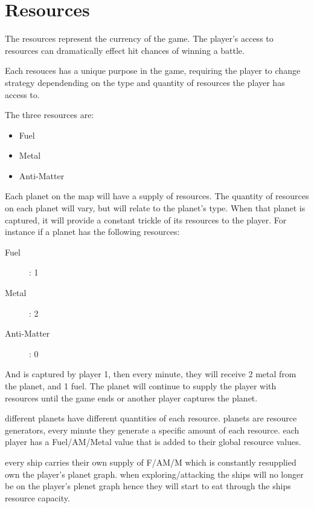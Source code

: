 \section{Resources}

\begin{comment}

what are resources

for each resources:
  - what it's used for
  - how it effects the game
  - how its earned

mention what their used for

\end{comment}

The resources represent the currency of the game. The player's access to resources can dramatically effect hit chances of winning a battle.

Each resouces has a unique purpose in the game, requiring the player to change strategy dependending on the type and quantity of resources the player has access to.

The three resources are:
\begin{itemize}
\item Fuel
\item Metal
\item Anti-Matter
\end{itemize}

Each planet on the map will have a supply of resources. 
The quantity of resources on each planet will vary, but will relate to the planet's type.
When that planet is captured, it will provide a constant trickle of its resources to the player.
For instance if a planet has the following resources:
\begin{description}
\item[Fuel]: 1
\item[Metal]: 2
\item[Anti-Matter]: 0
\end{description}
And is captured by player 1, then every minute, they will receive 2 metal from the planet, and 1 fuel. 
The planet will continue to supply the player with resources until the game ends or another player captures the planet.


		different planets have different quantities of each resource.
		planets are resource generators, every minute they generate a specific amount of each resource.
		each player has a Fuel/AM/Metal value that is added to their global resource values.

		every ship carries their own supply of F/AM/M which is constantly resupplied own the player's planet graph.
		when exploring/attacking the ships will no longer be on the player's plenet graph hence they will start to eat through the ships resource capacity.

